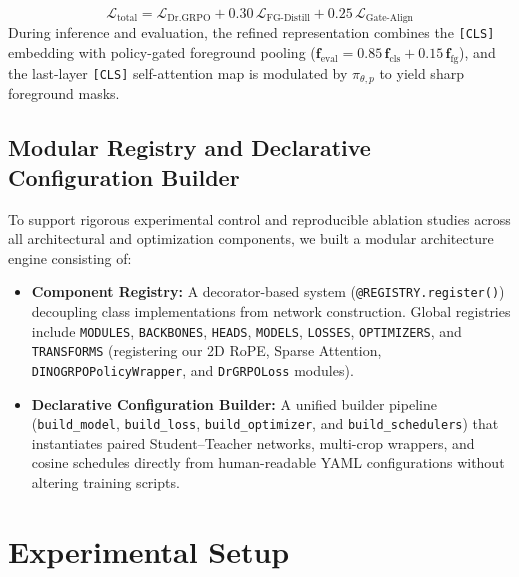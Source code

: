 \documentclass[11pt,a4paper]{article}
\begin{document}
\begin{equation}
\mathcal{L}_{\text{total}} = \mathcal{L}_{\text{Dr.GRPO}} + 0.30\,\mathcal{L}_{\text{FG-Distill}} + 0.25\,\mathcal{L}_{\text{Gate-Align}}
\label{eq:grpo_total_loss}
\end{equation}
During inference and evaluation, the refined representation combines the \texttt{[CLS]} embedding with policy-gated foreground pooling ($\mathbf{f}_{\text{eval}} = 0.85\,\mathbf{f}_{\text{cls}} + 0.15\,\mathbf{f}_{\text{fg}}$), and the last-layer \texttt{[CLS]} self-attention map is modulated by $\pi_{\theta, p}$ to yield sharp foreground masks.

\subsection{Modular Registry and Declarative Configuration Builder}
\label{subsec:registry_dag}

To support rigorous experimental control and reproducible ablation studies across all architectural and optimization components, we built a modular architecture engine consisting of:
\begin{itemize}[leftmargin=*]
    \item \textbf{Component Registry:} A decorator-based system (\texttt{@REGISTRY.register()}) decoupling class implementations from network construction. Global registries include \texttt{MODULES}, \texttt{BACKBONES}, \texttt{HEADS}, \texttt{MODELS}, \texttt{LOSSES}, \texttt{OPTIMIZERS}, and \texttt{TRANSFORMS} (registering our 2D RoPE, Sparse Attention, \texttt{DINOGRPOPolicyWrapper}, and \texttt{DrGRPOLoss} modules).
    \item \textbf{Declarative Configuration Builder:} A unified builder pipeline (\texttt{build\_model}, \texttt{build\_loss}, \allowbreak\texttt{build\_optimizer}, and \allowbreak\texttt{build\_schedulers}) that instantiates paired Student--Teacher networks, multi-crop wrappers, and cosine schedules directly from human-readable YAML configurations without altering training scripts.
\end{itemize}

\section{Experimental Setup}
\label{sec:experiments}
\end{document}
